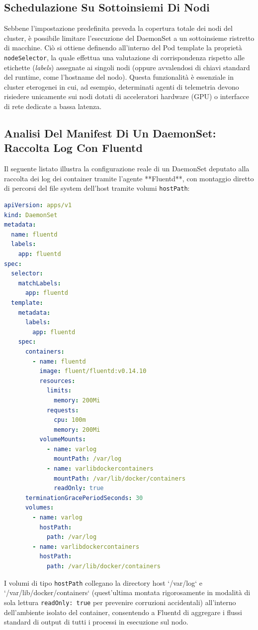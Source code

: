 \documentclass[11pt, a4paper]{article}
\begin{document}
\subsection{Schedulazione Su Sottoinsiemi Di Nodi}

Sebbene l'impostazione predefinita preveda la copertura totale dei nodi del cluster, è possibile limitare l'esecuzione del DaemonSet a un sottoinsieme ristretto di macchine. Ciò si ottiene definendo all'interno del Pod template la proprietà \texttt{nodeSelector}, la quale effettua una valutazione di corrispondenza rispetto alle etichette (\emph{labels}) assegnate ai singoli nodi (oppure avvalendosi di chiavi standard del runtime, come l'hostname del nodo). Questa funzionalità è essenziale in cluster eterogenei in cui, ad esempio, determinati agenti di telemetria devono risiedere unicamente sui nodi dotati di acceleratori hardware (GPU) o interfacce di rete dedicate a bassa latenza.

\subsection{Analisi Del Manifest Di Un DaemonSet: Raccolta Log Con Fluentd}

Il seguente listato illustra la configurazione reale di un DaemonSet deputato alla raccolta dei log dei container tramite l'agente **Fluentd**, con montaggio diretto di percorsi del file system dell'host tramite volumi \texttt{hostPath}:

\begin{lstlisting}[language=yaml]
apiVersion: apps/v1
kind: DaemonSet
metadata:
  name: fluentd
  labels:
    app: fluentd
spec:
  selector:
    matchLabels:
      app: fluentd
  template:
    metadata:
      labels:
        app: fluentd
    spec:
      containers:
        - name: fluentd
          image: fluent/fluentd:v0.14.10
          resources:
            limits:
              memory: 200Mi
            requests:
              cpu: 100m
              memory: 200Mi
          volumeMounts:
            - name: varlog
              mountPath: /var/log
            - name: varlibdockercontainers
              mountPath: /var/lib/docker/containers
              readOnly: true
      terminationGracePeriodSeconds: 30
      volumes:
        - name: varlog
          hostPath:
            path: /var/log
        - name: varlibdockercontainers
          hostPath:
            path: /var/lib/docker/containers
\end{lstlisting}

I volumi di tipo \texttt{hostPath} collegano la directory host `/var/log` e `/var/lib/docker/containers` (quest'ultima montata rigorosamente in modalità di sola lettura \texttt{readOnly: true} per prevenire corruzioni accidentali) all'interno dell'ambiente isolato del container, consentendo a Fluentd di aggregare i flussi standard di output di tutti i processi in esecuzione sul nodo.
\end{document}

